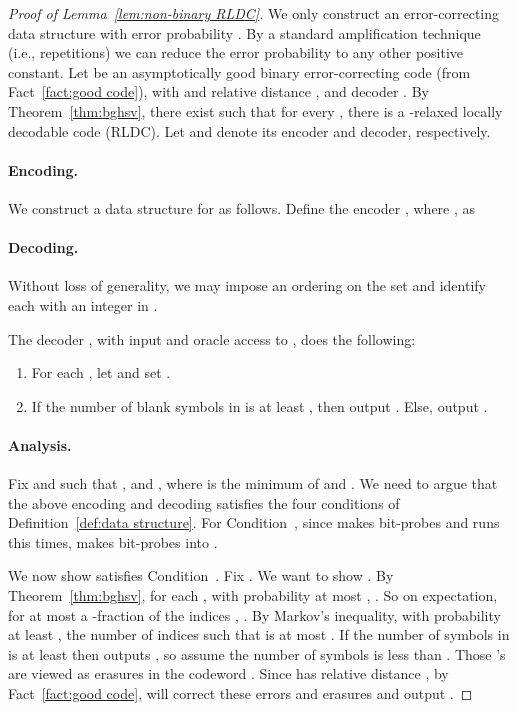 \documentclass[11pt,english]{article}
\theoremstyle{definition}
\theoremstyle{remark}
\begin{document}
\begin{proof}[Proof of Lemma~\ref{lem:non-binary RLDC}]
We only construct an error-correcting data structure with error probability .
By a standard amplification technique (i.e.,  repetitions)
we can reduce the error probability to any other positive constant.
Let  be an asymptotically
good binary error-correcting code (from Fact~\ref{fact:good code}),
with  and relative distance , and decoder
. By Theorem~\ref{thm:bghsv}, there exist 
such that for every , there is a -relaxed locally decodable code (RLDC).
Let  and  denote its encoder and decoder, respectively. 


\paragraph{\textbf{Encoding.}}

We construct a data structure for  as follows. Define the encoder
, where ,
as 

\paragraph{\textbf{Decoding.}}

Without loss of generality, we may impose an ordering on the set 
and identify each  with an integer in .

The decoder , with input  and oracle access to ,
does the following: 
\begin{enumerate}
\item For each , let 
and set . 
\item If the number of blank symbols  in  is at least ,
then output . Else, output . 
\end{enumerate}

\paragraph{\textbf{Analysis.}}

Fix  and  such that ,
and , where  is the minimum of 
and . We need to argue that the above encoding
and decoding satisfies the four conditions of Definition~\ref{def:data structure}.
For Condition~, since  makes  bit-probes and 
runs this  times,  makes  bit-probes into
.

We now show  satisfies Condition~. Fix . We want
to show . By Theorem~\ref{thm:bghsv},
for each , with probability at most ,
. So on expectation, for at most a -fraction
of the indices , . By Markov's inequality,
with probability at least , the number of indices  such
that  is at most . If
the number of  symbols in  is at least 
then  outputs , so assume the number of  symbols
is less than . Those 's are viewed as erasures
in the codeword . Since  has relative
distance , by Fact~\ref{fact:good code}, 
will correct these errors and erasures and output .


\end{proof}
\end{document}
